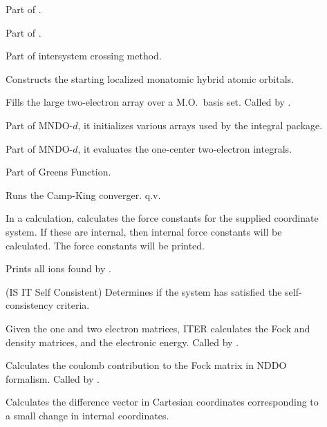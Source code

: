 \begin{description}
\item[] Part of .

\item[] Part of .

\item[] Part of intersystem crossing method.

\item[] Constructs the starting localized monatomic hybrid atomic
orbitals.

\item[] Fills the large two-electron array over a M.O.\ basis set.
Called by .

\item[] Part of MNDO-$d$, it initializes various arrays used by the
integral package.

\item[] Part of MNDO-$d$, it evaluates the one-center 
two-electron integrals.

\item[] Part of Greens Function.

\item[] Runs the Camp-King converger. q.v.

\item[] In a  calculation,  calculates the
force constants for the supplied coordinate system.  If these are internal,
then internal force constants will be calculated.  The force constants will be
printed.

\item[] Prints all ions found by .

\item[] (IS IT Self Consistent) Determines if the system has
satisfied the self-consistency criteria.

\item[] Given the one and two electron matrices,
ITER calculates the Fock and density matrices, and the electronic energy.
Called by .

\item[] Calculates the coulomb contribution to the Fock matrix in
NDDO formalism. Called by .

\item[] Calculates the difference vector in Cartesian coordinates
corresponding to a small change in internal coordinates.


\end{description}
